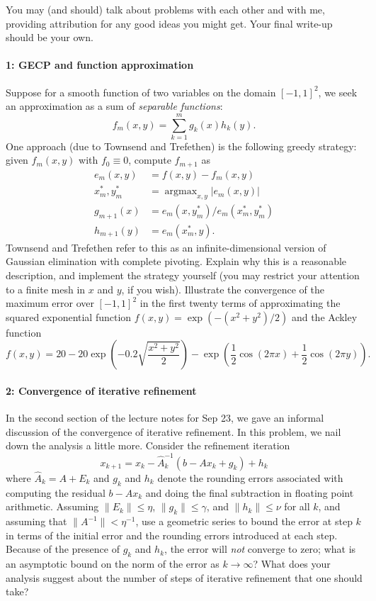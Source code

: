 \documentclass[12pt, leqno]{article} %
\begin{document}

You may (and should) talk about problems with each other and with me,
providing attribution for any good ideas you might get.  Your final
write-up should be your own.


\paragraph*{1: GECP and function approximation}
Suppose for a smooth function of two variables on the domain
$[-1,1]^2$, we seek an approximation as a sum of {\em separable functions}:
\[
  f_m(x,y) = \sum_{k=1}^m g_k(x) h_k(y).
\]
One approach (due to Townsend and Trefethen) is the following greedy
strategy: given $f_m(x,y)$ with $f_0 \equiv 0$, compute $f_{m+1}$ as
\begin{align*}
  e_{m}(x,y) &= f(x,y) - f_m(x,y) \\
  x_m^*, y_m^* &= \operatorname{argmax}_{x,y} |e_m(x,y)| \\
  g_{m+1}(x) &= e_m(x, y_m^*) / e_m(x_m^*, y_m^*) \\
  h_{m+1}(y) &= e_m(x_m^*, y).
\end{align*}
Townsend and Trefethen refer to this as an infinite-dimensional
version of Gaussian elimination with complete pivoting.  Explain why
this is a reasonable description, and implement the strategy yourself
(you may restrict your attention to a finite mesh in $x$ and $y$, if
you wish).  Illustrate the convergence of the maximum error over
$[-1,1]^2$ in the first twenty terms of approximating the squared
exponential function $f(x,y) = \exp(-(x^2+y^2)/2)$ and the Ackley function
\[
  f(x,y) =
  20
  -20 \exp\left( -0.2 \sqrt{\frac{x^2+y^2}{2}} \right)
  -\exp\left( \frac{1}{2} \cos(2\pi x) + \frac{1}{2} \cos(2\pi y) \right).
\]

\paragraph*{2: Convergence of iterative refinement}
In the second section of the lecture notes for Sep 23, we gave an
informal discussion of the convergence of iterative refinement.  In
this problem, we nail down the analysis a little more.  Consider the
refinement iteration
\[
  x_{k+1} = x_k - \hat{A}_k^{-1} (b - A x_k + g_k) + h_k
\]
where $\hat{A}_k = A + E_k$ and $g_k$ and $h_k$ denote the rounding
errors associated with computing the residual $b-Ax_k$ and doing the
final subtraction in floating point arithmetic.  Assuming $\|E_k\|
\leq \eta$, $\|g_k\| \leq \gamma$, and $\|h_k\| \leq \nu$ for all $k$,
and assuming that $\|A^{-1}\| < \eta^{-1}$, use a geometric series to
bound the error at step $k$ in terms of the initial error and the
rounding errors introduced at each step.  Because of the presence of
$g_k$ and $h_k$, the error will {\em not} converge to zero; what is an
asymptotic bound on the norm of the error as $k \rightarrow \infty$?
What does your analysis suggest about the number of steps of iterative
refinement that one should take?
\end{document}
